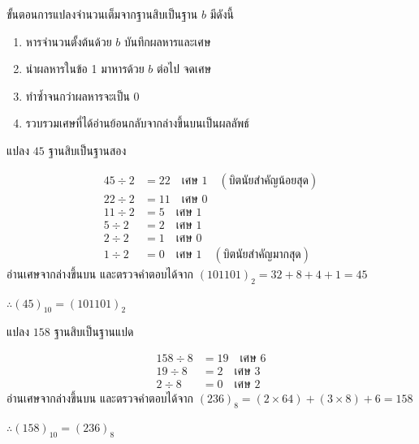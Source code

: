 \begin{principle}
\label{principle:decimal-to-any-base-steps}
ขั้นตอนการแปลงจำนวนเต็มจากฐานสิบเป็นฐาน $b$ มีดังนี้
\begin{enumerate}
    \item หารจำนวนตั้งต้นด้วย $b$ บันทึกผลหารและเศษ
    \item นำผลหารในข้อ 1 มาหารด้วย $b$ ต่อไป จดเศษ
    \item ทำซ้ำจนกว่าผลหารจะเป็น 0
    \item รวบรวมเศษที่ได้อ่านย้อนกลับจากล่างขึ้นบนเป็นผลลัพธ์
\end{enumerate}
\end{principle}

\begin{ex}
\label{ex:dec-to-bin-45}
แปลง $45$ ฐานสิบเป็นฐานสอง
\end{ex}
\begin{solution}
\begin{align*}
45 \div 2 &= 22 \quad \text{เศษ } 1 \quad (\text{บิตนัยสำคัญน้อยสุด})\\
22 \div 2 &= 11 \quad \text{เศษ } 0\\
11 \div 2 &= 5  \quad \text{เศษ } 1\\
 5 \div 2 &= 2  \quad \text{เศษ } 1\\
 2 \div 2 &= 1  \quad \text{เศษ } 0\\
 1 \div 2 &= 0  \quad \text{เศษ } 1 \quad (\text{บิตนัยสำคัญมากสุด})
\end{align*}
อ่านเศษจากล่างขึ้นบน และตรวจคำตอบได้จาก $(101101)_2 = 32+8+4+1 = 45$

$\therefore (45)_{10} = (101101)_2$ \solhere
\end{solution}

\begin{ex}
\label{ex:dec-to-oct-158}
แปลง $158$ ฐานสิบเป็นฐานแปด
\end{ex}
\begin{solution}
\begin{align*}
158 \div 8 &= 19 \quad \text{เศษ } 6\\
 19 \div 8 &= 2  \quad \text{เศษ } 3\\
  2 \div 8 &= 0  \quad \text{เศษ } 2
\end{align*}
อ่านเศษจากล่างขึ้นบน และตรวจคำตอบได้จาก $(236)_8 = (2 \times 64) + (3 \times 8) + 6 = 158$

$\therefore (158)_{10} = (236)_8$ \solhere
\end{solution}

